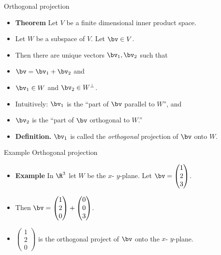 \documentclass{beamer}
\begin{document}
\begin{frame}{Orthogonal projection}
\begin{itemize}
\item \textbf{Theorem} Let $V$ be a finite dimensional inner product space.
\item Let $W$ be a subspace of $V$. Let $\bv\in V$.
\item Then there are unique vectors $\bv_1,\bv_2$ such that
\item $\bv=\bv_1+\bv_2$ and
\item $\bv_1 \in W$ and $\bv_2\in W^{\perp}$.
\item Intuitively: $\bv_1$ is the ``part of $\bv$ parallel to $W$'', and
\item $\bv_2$ is the ``part of $\bv$ orthogonal to $W$.''
\item \textbf{Definition.} $\bv_1$ is called the \emph{orthogonal} projection of $\bv$ onto $W$.
\end{itemize}

\end{frame}
\begin{frame}{Example Orthogonal projection}
\begin{itemize}
\item \textbf{Example} In $\R^3$ let $W$ be the $x$- $y$-plane. Let $\bv=
\begin{pmatrix}1\\2\\3 \end{pmatrix}$.
\item Then $\bv=
\begin{pmatrix}
1\\2\\0
\end{pmatrix}
+
\begin{pmatrix}
0\\0\\3
\end{pmatrix}
$.
\item $\begin{pmatrix}
1\\2\\0
\end{pmatrix}$
is the orthogonal project of $\bv$ onto the $x$- $y$-plane.
\end{itemize}

\end{frame}
\end{document}
